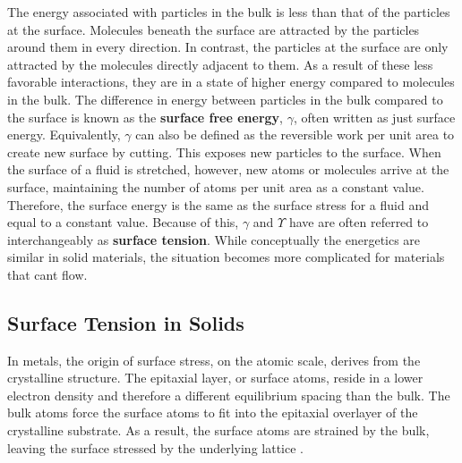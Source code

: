 The energy associated with particles in the bulk is less than that of the particles at the surface. Molecules beneath the surface are attracted by the particles around them in every direction. In contrast, the particles at the surface are only attracted by the molecules directly adjacent to them. As a result of these less favorable interactions, they are in a state of higher energy compared to molecules in the bulk. The difference in energy between particles in the bulk compared to the surface is known as the \textbf{surface free energy}, $\gamma$, often written as just surface energy. Equivalently, $\gamma$ can also be defined as the reversible work per unit area to create new surface by cutting. This exposes new particles to the surface. When the surface of a fluid is stretched, however, new atoms or molecules arrive at the surface, maintaining the number of atoms per unit area as a constant value. Therefore, the surface energy is the same as the surface stress for a fluid and equal to a constant value. Because of this, $\gamma$ and $\Upsilon$ have are often referred to interchangeably as \textbf{surface tension}. While conceptually the energetics are similar in solid materials, the situation becomes more complicated for materials that cant flow.

\subsection{Surface Tension in Solids}
In metals, the origin of surface stress, on the atomic scale, derives from the crystalline structure. The epitaxial layer, or surface atoms, reside in a lower electron density and therefore a different equilibrium spacing than the bulk. The bulk atoms force the surface atoms to fit into the epitaxial overlayer of the crystalline substrate. As a result, the surface atoms are strained by the bulk, leaving the surface stressed by the underlying lattice \cite{cammarata1994surface}. 


